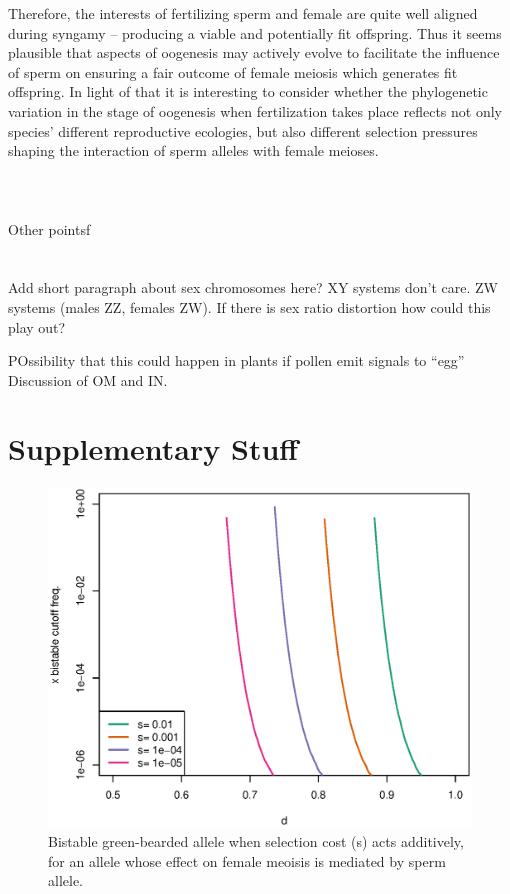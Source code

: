 \documentclass[12pt,letterpaper]{article}
\newcommand{\gc}[1]{{ \color{red} #1}}
\begin{document}
Therefore, the interests of fertilizing sperm and female are quite well aligned during syngamy -- producing a viable and potentially fit offspring. 
Thus it seems plausible that aspects of oogenesis may actively evolve to facilitate the influence of sperm on ensuring a fair  outcome of female meiosis which generates fit offspring.
In light of that it is interesting to consider whether the phylogenetic variation in the stage of oogenesis when fertilization takes place reflects not
	only species' different reproductive ecologies, but also different selection pressures shaping the interaction of sperm alleles with female meioses. 
\\
\\
\\
\\
\gc{Other pointsf}\\
\\
\\
\gc{Add short paragraph about sex chromosomes here? XY systems don't care. ZW systems (males ZZ, females ZW). If there is
sex ratio distortion how could this play out?}


 
 
POssibility that this could happen in plants if pollen emit signals to ``egg''
Discussion of OM and IN.





\section*{Supplementary Stuff}

\begin{figure}
\includegraphics[width = 0.8 \textwidth]{Figures/bistable_x_vs_d_additive_s.eps} 
\caption{Bistable green-bearded allele when selection cost (s) acts
  additively, for an allele whose effect
 on female meoisis is mediated by sperm allele. }  \label{bistable_additive}
\end{figure}
\end{document}
